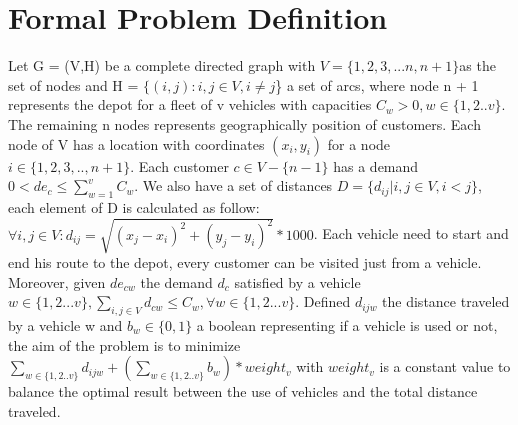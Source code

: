 \section{Formal Problem Definition}
Let G = (V,H) be a complete directed graph with \begin{math}V = \{1,2,3,...n, n + 1\} \end{math}as the set of nodes and H = \begin{math}\{(i,j) : i,j \in V, i \neq j\end{math}\} a set of arcs, where node n + 1 represents the depot for a fleet of v vehicles with capacities \begin{math}C_{w} > 0, w \in \{1,2..v\} \end{math}. The remaining n nodes represents geographically position of customers. Each node of V has a location with coordinates \begin{math}(x_{i}, y_{i}) \end{math} for a node \begin{math}i \in \{1,2,3,.., n + 1\}\end{math}. Each customer \begin{math} c \in V - \{n-1\}\end{math} has a demand \begin{math} 0 < de_{c} \leq \sum_{w = 1}^{v} C_{w}.\end{math} We also have a set of distances \begin{math} D = \{d_{ij} | i,j \in V, i < j\} \end{math}, each element of D is calculated as follow: 
\begin{math}\forall i,j \in V: d_{ij} = \sqrt{(x_{j} - x_{i})^2 + (y_{j} - y_{i})^2} * 1000\end{math}. Each vehicle need to start and end his route to the depot, every customer can be visited just from a vehicle. Moreover, given \begin{math}de_{cw}\end{math} the demand \begin{math} d_{c}\end{math} satisfied by a vehicle \begin{math}w \in \{1,2...v\},\sum_{i,j \in V }d_{cw} \leq C_{w}, \forall w \in \{1,2...v\}\end{math}. Defined \begin{math}d_{ijw}\end{math} the distance traveled by a vehicle w and \begin{math} b_{w} \in \{0,1\}\end{math} a boolean representing if a vehicle is used or not, the aim of the problem is to minimize \begin{math}\sum_{w \in \{1,2..v\}}d_{ijw} + (\sum_{w \in \{1,2..v\}}b_{w}) * weight_{v}\end{math} with \begin{math}weight_{v}\end{math} is a constant value to balance the optimal result between the use of vehicles and the total distance traveled.\newline



